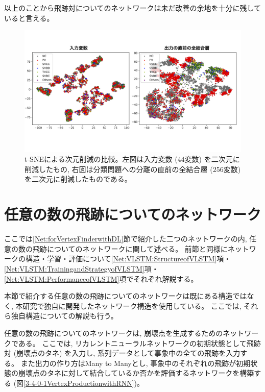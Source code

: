 以上のことから飛跡対についてのネットワークは未だ改善の余地を十分に残していると言える。

\begin{figure}[htbp]
 \centering
 \includegraphics[width=1.0\textwidth]{Figure/3Networks/3-3-3-3tSNE.png}
 \caption[t-SNEによる次元削減の比較]{t-SNEによる次元削減の比較。左図は入力変数 ($44$変数) を二次元に削減したもの, 右図は分類問題への分離の直前の全結合層 ($256$変数) を二次元に削減したものである。}
 \label{3-3-3-3tSNE}
\end{figure}

\newpage
\section{任意の数の飛跡についてのネットワーク} \label{Net:VertexLSTM}

ここでは\ref{Net:forVertexFinderwithDL}節で紹介した二つのネットワークの内, 任意の数の飛跡についてのネットワークに関して述べる。
前節と同様にネットワークの構造・学習・評価について\ref{Net:VLSTM:StructureofVLSTM}項・\ref{Net:VLSTM:TrainingandStrategyofVLSTM}項・\ref{Net:VLSTM:PerformanceofVLSTM}項でそれぞれ解説する。

本節で紹介する任意の数の飛跡についてのネットワークは既にある構造ではなく, 本研究で独自に開発したネットワーク構造を使用している。
ここでは, それら独自構造についての解説も行う。

任意の数の飛跡についてのネットワークは, 崩壊点を生成するためのネットワークである。
ここでは, リカレントニューラルネットワークの初期状態として飛跡対 (崩壊点のタネ) を入力し, 系列データとして事象中の全ての飛跡を入力する。
また出力の作り方はMany to Manyとし, 事象中のそれぞれの飛跡が初期状態の崩壊点のタネに対して結合しているか否かを評価するネットワークを構築する (図\ref{3-4-0-1VertexProductionwithRNN})。


